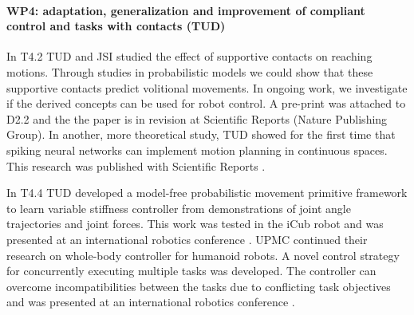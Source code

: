 

\paragraph*{WP4: adaptation, generalization and improvement of compliant control and tasks with contacts (TUD)}


In T4.2 TUD and JSI studied the effect of supportive contacts on reaching 
motions. Through studies in probabilistic models we could show that these 
supportive contacts predict volitional movements. In ongoing work, we 
investigate if the derived concepts can be used for robot control. A pre-print 
was attached to D2.2 and the the paper is in revision at Scientific Reports 
(Nature Publishing Group). In another, more theoretical study, TUD showed for 
the first time that spiking neural networks can implement motion planning in 
continuous spaces. This research was published with Scientific Reports 
\cite{Rueckert_SR_2016}. 

In T4.4 TUD developed a model-free probabilistic movement primitive framework to 
learn variable stiffness controller from demonstrations of joint angle 
trajectories and joint forces. This work was tested in the iCub robot and was 
presented at an international robotics conference \cite{paraschos2015model}. 
UPMC continued their research on whole-body controller for humanoid robots. A 
novel control strategy for concurrently executing multiple tasks was developed. 
The controller can overcome incompatibilities between the tasks due to 
conflicting task objectives and was presented at an international robotics 
conference \cite{lober2015variance}.  